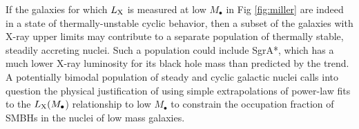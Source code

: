 \documentclass[usenatbib,fleqn]{mn2e}
\begin{document}


If the galaxies for which $L_{\rm X}$ is measured at low $M_{\bullet}$ in Fig
\ref{fig:miller} are indeed in a state of thermally-unstable cyclic behavior, then a subset of the galaxies with X-ray upper limits may contribute to a separate population of thermally stable, steadily accreting nuclei.  Such a population could include SgrA*, which has a much lower X-ray luminosity for its black hole mass than predicted by the \citet{Miller+15} trend.  A potentially bimodal population of steady and cyclic galactic nuclei calls into question the physical justification of using simple extrapolations of power-law fits to the $L_{\rm X}(M_{\bullet}$) relationship to low $M_{\bullet}$ to constrain the occupation fraction of SMBHs in the nuclei of low mass galaxies.

  
\end{document}
